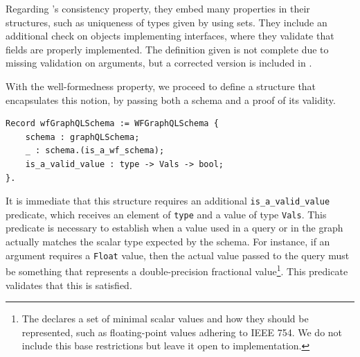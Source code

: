 Regarding \HP{}'s consistency property, they embed many properties in their structures, such as uniqueness of types given by using sets. They include an additional check on objects implementing interfaces, where they validate that fields are properly implemented. The definition given is not complete due to missing validation on arguments, but a corrected version is included in \cite{olafschema}.



With the well-formedness property, we proceed to define a structure that encapsulates this notion, by passing both a schema and a proof of its validity.

\begin{verbatim}
Record wfGraphQLSchema := WFGraphQLSchema {
    schema : graphQLSchema;
    _ : schema.(is_a_wf_schema);
    is_a_valid_value : type -> Vals -> bool;
}.
\end{verbatim}

It is immediate that this structure requires an additional \texttt{is_a_valid_value} predicate, which receives an element of \texttt{type} and a value of type \texttt{Vals}. This predicate is necessary to establish when a value used in a query or in the graph actually matches the scalar type expected by the schema. For instance, if an argument requires a \texttt{Float} value, then the actual value passed to the query must be something that represents a double-precision fractional value\footnote{The \spec{} declares a set of minimal scalar values and how they should be represented, such as floating-point values adhering to IEEE 754. We do not include this base restrictions but leave it open to implementation.}. This predicate validates that this is satisfied.


